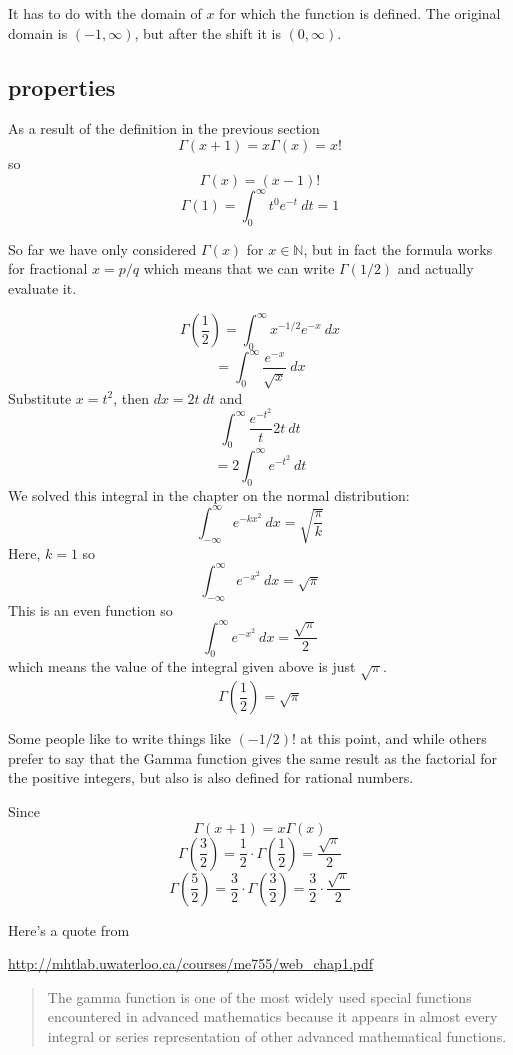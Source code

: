 \documentclass[11pt, oneside]{article}
\begin{document}
It has to do with the domain of $x$ for which the function is defined.  The original domain is $(-1, \infty)$, but after the shift it is $(0, \infty)$.

\subsection*{properties}

As a result of the definition in the previous section
\[ \Gamma(x + 1) = x \Gamma(x) = x! \]
so 
\[ \Gamma(x) = (x-1)! \]
\[ \Gamma(1) = \int_0^{\infty} t^0 e^{-t} \ dt = 1 \]

So far we have only considered $\Gamma(x)$ for $x \in \mathbb{N}$, but in fact the formula works for fractional $x = p/q$ which means that we can write $\Gamma (1/2)$ and actually evaluate it.

\[ \Gamma(\frac{1}{2}) = \int _0^{\infty} x^{-1/2} e^{-x} \ dx \]
\[ = \int _0^{\infty} \frac{e^{-x}}{\sqrt{x}} \ dx \]
Substitute $x = t^2$, then $dx = 2 t \ dt$ and
\[ \int _0^{\infty} \frac{e^{-t^2}}{t} 2t \ dt \]
\[ = 2 \int _0^{\infty} e^{-t^2} \ dt \]
We solved this integral in the chapter on the normal distribution:
\[ \int_{-\infty}^{\infty} e^{-kx^2} \ dx = \sqrt{\frac{\pi}{k}} \]
Here, $k = 1$ so
\[ \int_{-\infty}^{\infty} e^{-x^2} \ dx = \sqrt{\pi} \]
This is an even function so
\[ \int_0^{\infty} e^{-x^2} \ dx = \frac{\sqrt{\pi}}{2} \]
which means the value of the integral given above is just $\sqrt{\pi}$.
\[ \Gamma(\frac{1}{2}) = \sqrt{\pi} \]

Some people like to write things like $(-1/2)!$ at this point, and while others prefer to say that the Gamma function gives the same result as the factorial for the positive integers, but also is also defined for rational numbers.

Since
\[ \Gamma(x + 1) = x \Gamma(x) \]
\[ \Gamma(\frac{3}{2}) = \frac{1}{2} \cdot \Gamma(\frac{1}{2}) = \frac{\sqrt{\pi}}{2} \]
\[ \Gamma(\frac{5}{2}) = \frac{3}{2} \cdot \Gamma(\frac{3}{2}) = \frac{3}{2} \cdot \frac{\sqrt{\pi}}{2} \]

Here's a quote from 

\url{http://mhtlab.uwaterloo.ca/courses/me755/web_chap1.pdf}

\begin{quote}The gamma function is one of the most widely used special functions encountered in advanced mathematics because it appears in almost every integral or series representation of other advanced mathematical functions.\end{quote}
\end{document}

